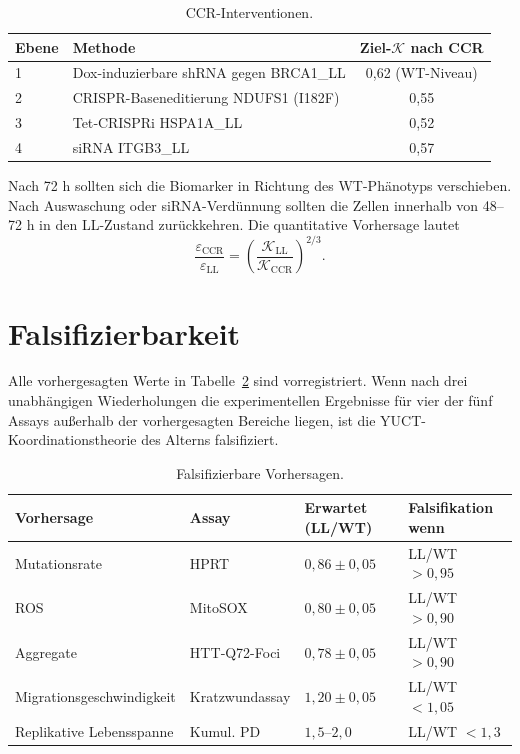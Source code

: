 \documentclass[12pt,a4paper]{article}
\newcommand{\REL}{\mathcal{K}}          %
\begin{document}
	\begin{table}[H]
		\centering
		\caption{CCR-Interventionen.}
		\label{tab:CCR}
		\begin{tabular}{@{}llc@{}}
			\toprule
			\textbf{Ebene} & \textbf{Methode} & \textbf{Ziel-\(\REL\) nach CCR} \\
			\midrule
			1 & Dox-induzierbare shRNA gegen BRCA1\_LL & 0,62 (WT-Niveau) \\
			2 & CRISPR-Baseneditierung NDUFS1 (I182F)       & 0,55 \\
			3 & Tet‑CRISPRi HSPA1A\_LL               & 0,52 \\
			4 & siRNA ITGB3\_LL                      & 0,57 \\
			\bottomrule
		\end{tabular}
	\end{table}
	
	Nach 72 h sollten sich die Biomarker in Richtung des WT-Phänotyps verschieben. Nach Auswaschung oder siRNA-Verdünnung sollten die Zellen innerhalb von 48–72 h in den LL-Zustand zurückkehren. Die quantitative Vorhersage lautet
	\[
	\frac{\varepsilon_{\mathrm{CCR}}}{\varepsilon_{\mathrm{LL}}} = \left(\frac{\REL_{\mathrm{LL}}}{\REL_{\mathrm{CCR}}}\right)^{2/3}.
	\]
	
	\section{Falsifizierbarkeit}
	\label{sec:falsifiability}
	Alle vorhergesagten Werte in Tabelle~\ref{tab:predictions} sind vorregistriert. Wenn nach drei unabhängigen Wiederholungen die experimentellen Ergebnisse für vier der fünf Assays außerhalb der vorhergesagten Bereiche liegen, ist die YUCT-Koordinationstheorie des Alterns falsifiziert.
	
	\begin{table}[H]
		\centering
		\caption{Falsifizierbare Vorhersagen.}
		\label{tab:predictions}
		\begin{tabular}{@{}llll@{}}
			\toprule
			\textbf{Vorhersage} & \textbf{Assay} & \textbf{Erwartet (LL/WT)} & \textbf{Falsifikation wenn} \\
			\midrule
			Mutationsrate       & HPRT           & \(0,86 \pm 0,05\) & LL/WT \(> 0,95\) \\
			ROS                 & MitoSOX        & \(0,80 \pm 0,05\) & LL/WT \(> 0,90\) \\
			Aggregate           & HTT‑Q72-Foci   & \(0,78 \pm 0,05\) & LL/WT \(> 0,90\) \\
			Migrationsgeschwindigkeit & Kratzwundassay & \(1,20 \pm 0,05\) & LL/WT \(< 1,05\) \\
			Replikative Lebensspanne & Kumul. PD     & \(1,5\)–\(2,0\)    & LL/WT \(< 1,3\) \\
			\bottomrule
		\end{tabular}
	\end{table}
	
\end{document}
